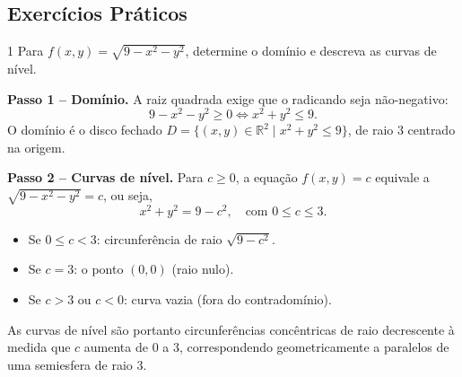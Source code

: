 \subsection{Exercícios Práticos}

\begin{exercisebox}{1}
  Para $f(x,y)=\sqrt{9-x^2-y^2}$, determine o domínio e descreva as
  curvas de nível.
\end{exercisebox}
\begin{solbox}
  \textbf{Passo 1 -- Domínio.} A raiz quadrada exige que o radicando seja
  não-negativo:
  \[
    9-x^2-y^2 \geq 0 \iff x^2+y^2 \leq 9.
  \]
  O domínio é o disco fechado $D = \{(x,y)\in\mathbb{R}^2 \mid x^2+y^2\leq 9\}$,
  de raio $3$ centrado na origem.

  \textbf{Passo 2 -- Curvas de nível.} Para $c\geq 0$, a equação $f(x,y)=c$
  equivale a $\sqrt{9-x^2-y^2}=c$, ou seja,
  \[
    x^2+y^2 = 9-c^2, \quad \text{com } 0\leq c\leq 3.
  \]
  \begin{itemize}
    \item Se $0\leq c < 3$: circunferência de raio $\sqrt{9-c^2}$.
    \item Se $c=3$: o ponto $(0,0)$ (raio nulo).
    \item Se $c>3$ ou $c<0$: curva vazia (fora do contradomínio).
  \end{itemize}
  As curvas de nível são portanto circunferências concêntricas de raio
  decrescente à medida que $c$ aumenta de $0$ a $3$, correspondendo
  geometricamente a paralelos de uma semiesfera de raio $3$.
\end{solbox}

